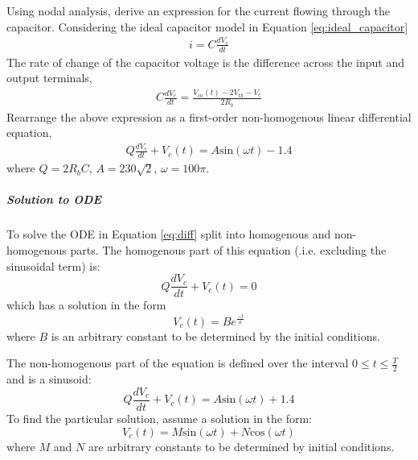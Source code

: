 Using nodal analysis, derive an expression for the current flowing through the capacitor. Considering the ideal capacitor model in Equation \ref{eq:ideal_capacitor}
\begin{align}
	i = C\frac{dV_c}{dt}
\end{align}
The rate of change of the capacitor voltage is the difference across the input and output terminals,
\begin{align}
	C\frac{dV_c}{dt} = \frac{V_{in}(t) - 2V_{th} - V_c}{2R_b}
\end{align}
Rearrange the above expression as a first-order non-homogenous linear differential equation,
\begin{align}
	Q\frac{dV_c}{dt} + V_c(t) = A\text{sin}(\omega t) - 1.4
	\label{eq:diff}
\end{align}
where $Q = 2R_bC$, $A = 230\sqrt{2}$, $\omega = 100\pi$.

\subparagraph{Solution to ODE} To solve the ODE in Equation \ref{eq:diff} split into homogenous and non-homogenous parts. The homogenous part of this equation (.i.e. excluding the sinusoidal term) is:
\begin{equation}
	Q\frac{dV_c}{dt} + V_c(t) = 0
\end{equation}
which has a solution in the form
\begin{equation}
	V_c(t) = Be^{\frac{-t}{a}}
\end{equation}
where $B$ is an arbitrary constant to be determined by the initial conditions. 

The non-homogenous part of the equation is defined over the interval $0 \leq t \leq \frac{T}{2}$ and is a sinusoid:
\begin{equation}
	Q\frac{dV_c}{dt} + V_c(t) = A\text{sin}(\omega t) + 1.4
\end{equation}
To find the particular solution, assume a solution in the form:
\begin{equation}
	V_c(t) = M\text{sin}(\omega t) + N\text{cos}(\omega t)
\end{equation}
where $M$ and $N$ are arbitrary constants to be determined by initial conditions. 

